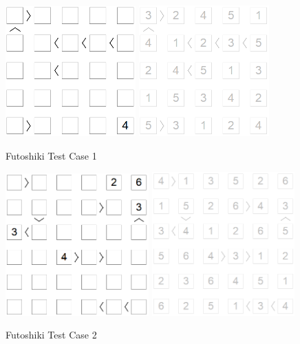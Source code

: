 \documentclass{article}
\begin{document}
\begin{enumerate}
    \begin{figure}[htbp]
    \centering
    \includegraphics[width=5cm]{Pic/f1}
    \qquad
    \includegraphics[width=5cm]{Pic/f1s}
    \caption{Futoshiki Test Case 1}
    \label{fig:case11}
  \end{figure}
        \begin{figure}[htbp]
    \centering
    \includegraphics[width=5.5cm]{Pic/f2}
    \qquad
    \includegraphics[width=5.5cm]{Pic/f2s}
    \caption{Futoshiki Test Case 2}

\end{figure}
\end{enumerate}
\end{document}
